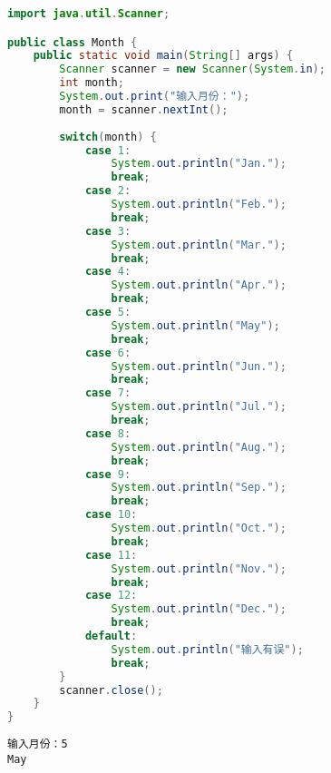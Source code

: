 
\begin{lstlisting}[language=Java]
import java.util.Scanner;

public class Month {
	public static void main(String[] args) {
		Scanner scanner = new Scanner(System.in);
		int month;
		System.out.print("输入月份：");
		month = scanner.nextInt();
		
		switch(month) {
			case 1:
				System.out.println("Jan.");
				break;
			case 2:
				System.out.println("Feb.");
				break;
			case 3:
				System.out.println("Mar.");
				break;
			case 4:
				System.out.println("Apr.");
				break;
			case 5:
				System.out.println("May");
				break;
			case 6:
				System.out.println("Jun.");
				break;
			case 7:
				System.out.println("Jul.");
				break;
			case 8:
				System.out.println("Aug.");
				break;
			case 9:
				System.out.println("Sep.");
				break;
			case 10:
				System.out.println("Oct.");
				break;
			case 11:
				System.out.println("Nov.");
				break;
			case 12:
				System.out.println("Dec.");
				break;
			default:
				System.out.println("输入有误");
				break;
		}
		scanner.close();
	}
}
\end{lstlisting}

\begin{tcolorbox}
	\begin{verbatim}
输入月份：5
May
	\end{verbatim}
\end{tcolorbox}

\newpage